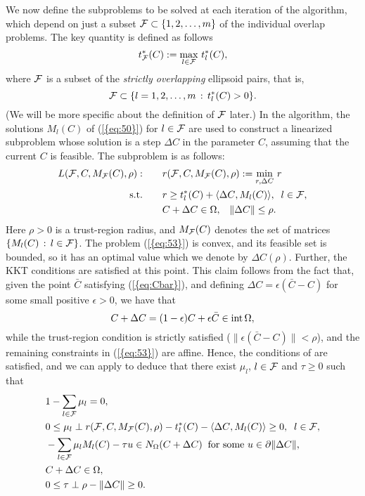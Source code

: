 \documentclass{siamltex}
\begin{document}
We now define the subproblems to be solved at each iteration of the
algorithm, which depend on just a subset ${{\cal F}} \subset
\{1,2,\dotsc,m\}$ of the individual overlap problems.  The key
quantity is defined as follows
\begin{equation} \label{eq:52} 
t^*_{{\cal F}} (C) := \max_{l \in  {{\cal F}}} \, t^*_l(C),
\end{equation}
where ${{\cal F}}$ is a subset of the {\em strictly overlapping} ellipsoid
pairs, that is,
\[
{{\cal F}} \subset \{ l=1,2,\dotsc,m \, : \, t^*_l(C) > 0 \}.
\]
(We will be more specific about the definition of ${{\cal F}}$ later.)
In the algorithm, the solutions $M_l(C)$ of {(\ref{{eq:50}})} for $l \in
{{\cal F}}$ are used to construct a linearized subproblem whose solution is a
step ${\Delta C}$ in the parameter $C$, assuming that the current $C$ is
feasible.  The subproblem is as follows:
\begin{subequations}  \label{eq:53}
\begin{align}
L({{\cal F}},C,M_{{\cal F}}(C),\rho): \qquad &r({{\cal F}},C,M_{{\cal F}}(C),\rho) 
:= \min_{r, {\Delta C}} \, r \\
\mbox{s.t.} \qquad &r \ge t^*_l(C) + \langle {\Delta C} , M_l(C) \rangle, \;\;
l \in {{\cal F}}, \\
&C + {\Delta C}  \in \Omega, \;\;\; \|{\Delta C}\| \le \rho.
\end{align}
\end{subequations}
Here $\rho>0$ is a trust-region radius, and $M_{{\cal F}}(C)$ denotes the
set of matrices $\{ M_l(C) \, : \, l \in {{\cal F}} \}$.  The problem
{(\ref{{eq:53}})} is convex, and its feasible set is bounded, so it has an
optimal value which we denote by ${\Delta C}(\rho)$.  Further, the KKT
conditions are satisfied at this point. This claim follows from the
fact that, given the point $\bar{C}$ satisfying {(\ref{{eq:Cbar}})}, and
defining ${\Delta C} = \epsilon(\bar{C}-C)$ for some small positive
$\epsilon>0$, we have that
\[
C + {\Delta C} = (1-\epsilon)C + \epsilon \bar{C} \in {\mbox{\rm int}\,} \Omega,
\]
while the trust-region condition is strictly satisfied ($\| \epsilon
(\bar{C}-C) \| < \rho$), and the remaining  constraints in {(\ref{{eq:53}})}
are affine. Hence, the conditions of \cite[Theorem~28.2]{Roc70} are
satisfied, and we can apply \cite[Corollary~28.3.1]{Roc70} to deduce
that there exist
$\mu_l$, $l \in {{\cal F}}$ and $\tau \ge 0$
such that
\begin{subequations} \label{eq:55}
\begin{align}
&1-\sum_{l \in {{\cal F}}} \mu_l = 0, \\
&0 \le \mu_l \perp r({{\cal F}},C,M_{{\cal F}}(C),\rho) - t^*_l(C) - \langle
{\Delta C}, M_l(C) \rangle \ge 0, \;\; l \in {{\cal F}}, \\
&- \sum_{l \in {{\cal F}}} \mu_l M_l(C) - \tau u \in N_{\Omega}(C+{\Delta C}) \;\;
\mbox{for some $u \in \partial \|{\Delta C}\|$,} \\
&C + {\Delta C} \in \Omega, \\
&0 \le \tau \perp  \rho - \| {\Delta C} \| \ge 0.
\end{align}
\end{subequations}
\end{document}
